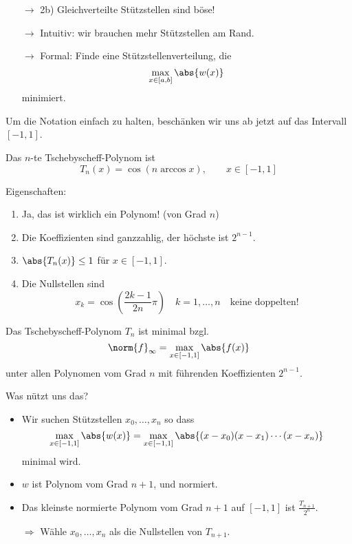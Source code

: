 \begin{itemize}
 \item[$\rightarrow$] 2b) Gleichverteilte Stützstellen sind böse!
 \item[$\rightarrow$] Intuitiv: wir brauchen mehr Stützstellen am Rand.
  \item[$\rightarrow$] Formal: Finde eine Stützstellenverteilung, die
  \begin{equation*}
    \max_{x\in[a,b]} \abs{ w(x) }
  \end{equation*}
  minimiert.
\end{itemize}

Um die Notation einfach zu halten, beschänken wir uns ab jetzt auf das Intervall $[-1,1]$.

\begin{definition}
 Das $n$-te Tschebyscheff-Polynom ist
 \begin{equation*}
    T_n(x) = \cos( n \arccos x ),\qquad x\in[-1,1]
 \end{equation*}
\end{definition}

Eigenschaften:
\begin{enumerate}
 \item Ja, das ist wirklich ein Polynom! (von Grad $n$)
 \item Die Koeffizienten sind ganzzahlig, der höchste ist $2^{n-1}$.
 \item $\abs{T_n(x)} \leq 1$ für $x\in[-1,1]$.
 \item Die Nullstellen sind
 \begin{equation*}
    x_k = \cos\left( \frac{2k-1}{2n} \pi\right) \quad k=1,\hdots,n\quad \text{keine doppelten!}
 \end{equation*}

\end{enumerate}


\begin{satz}
 Das Tschebyscheff-Polynom $T_n$ ist minimal bzgl.
 \begin{equation*}
    \norm{ f}_\infty = \max_{x\in [-1,1]} \abs{ f(x)}
 \end{equation*}
 unter allen Polynomen vom Grad $n$ mit führenden Koeffizienten $2^{n-1}$.

\end{satz}

Was nützt uns das?
\begin{itemize}
 \item Wir suchen Stützstellen $x_0,\hdots,x_n$ so dass
 \begin{equation*}
    \max_{x\in [-1,1]} \abs{ w(x)} = \max_{x\in [-1,1]} \abs{ (x-x_0)(x-x_1)\cdots (x-x_n)}
 \end{equation*}
 minimal wird.
 \item $w$ ist Polynom vom Grad $n+1$, und normiert.
 \item Das kleinste normierte Polynom vom Grad $n+1$ auf $[-1,1]$ ist $\frac{T_{n+1}}{2^{n}}$.
 \item[$\Rightarrow$] Wähle $x_0,\hdots,x_n$ als die Nullstellen von $T_{n+1}$.

\end{itemize}

